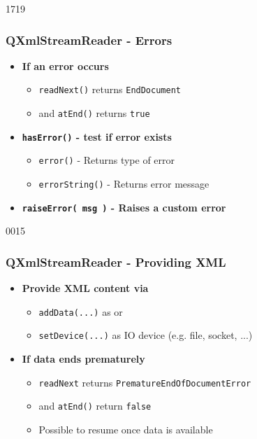 \begin{slide}[fragile]{1719}\frametitle{QXmlStreamReader - Errors}
\begin{itemize}
\item \textbf{If an error occurs}
  \begin{itemize}
  \item \texttt{readNext()} returns \texttt{EndDocument}
  \item and \texttt{atEnd()} returns \texttt{true}
  \end{itemize}
\item \textbf{\texttt{hasError()} - test if error exists}
  \begin{itemize}
  \item \texttt{error()} - Returns type of error
  \item \texttt{errorString()} - Returns error message
  \end{itemize}
\item \textbf{\texttt{raiseError( msg )} - Raises a custom error}
\end{itemize}
\end{slide}

\begin{slide}{0015}\frametitle{QXmlStreamReader - Providing XML}
\begin{itemize}
\item \textbf{Provide XML content via}
  \begin{itemize}
  \item \texttt{addData(...)} as  or 
  \item \texttt{setDevice(...)} as IO device (e.g. file, socket, ...)
  \end{itemize}
\item \textbf{If data ends prematurely}
  \begin{itemize}
  \item \texttt{readNext} returns \texttt{PrematureEndOfDocumentError}
  \item and \texttt{atEnd()} return \texttt{false}
  \item Possible to resume once data is available
  \end{itemize}
\end{itemize}
\end{slide}

